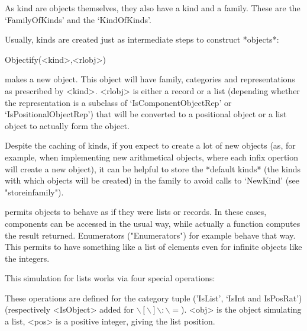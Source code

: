 \danger
As kind are objects themselves, they also have a kind and a family.
These are the `FamilyOfKinds' and the `KindOfKinds'.

Usually, kinds are created just as intermediate steps to construct *objects*:

\>Objectify(<kind>,<rlobj>)

makes a new object. This object will have family, categories and
representations as prescribed by <kind>.
<rlobj> is either a record or a list (depending whether the representation
is a subclass of `IsComponentObjectRep' or `IsPositionalObjectRep') that
will be converted to a positional object or a list object to actually form
the object.

\danger
Despite the caching of kinds, if you expect to create a lot of
new objects (as, for example, when implementing new arithmetical objects,
where each infix opertion will create a new object), it can be helpful to
store the *default kinds* (the kinds with which objects will be
created) in the family to avoid calls to `NewKind' (see "storeinfamily").



{\GAP} permits objects to behave as if they were lists or records. In these
cases, components can be accessed in the usual way, while actually a
function computes the result returned. Enumerators ("Enumerators") for
example behave that way. This permits to have something like a list of
elements even for infinite objects like the integers.

This simulation for lists works via four special operations:

\index{$\backslash[\backslash]$}

These operations are defined for the category tuple
('IsList', `IsInt and IsPosRat') (respectively <IsObject> added for
$\backslash[\backslash]\backslash:\backslash=$).
<obj> is the object simulating a list, <pos> is a positive integer, giving
the list position.

